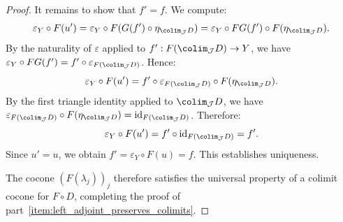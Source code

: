 \begin{proof}
    It remains to show that $f' = f$. We compute:
    $$
    \varepsilon_Y \circ F(u') = \varepsilon_Y \circ F(G(f') \circ \eta_{\colim_{\mathcal{J}} D}) = \varepsilon_Y \circ FG(f') \circ F(\eta_{\colim_{\mathcal{J}} D}).
    $$
    By the naturality of $\varepsilon$ applied to $f' : F(\colim_{\mathcal{J}} D) \to Y$, we have $\varepsilon_Y \circ FG(f') = f' \circ \varepsilon_{F(\colim_{\mathcal{J}} D)}$. Hence:
    $$
    \varepsilon_Y \circ F(u') = f' \circ \varepsilon_{F(\colim_{\mathcal{J}} D)} \circ F(\eta_{\colim_{\mathcal{J}} D}).
    $$
    By the first triangle identity applied to $\colim_{\mathcal{J}} D$, we have $\varepsilon_{F(\colim_{\mathcal{J}} D)} \circ F(\eta_{\colim_{\mathcal{J}} D}) = \mathrm{id}_{F(\colim_{\mathcal{J}} D)}$. Therefore:
    $$
    \varepsilon_Y \circ F(u') = f' \circ \mathrm{id}_{F(\colim_{\mathcal{J}} D)} = f'.
    $$
    Since $u' = u$, we obtain $f' = \varepsilon_Y \circ F(u) = f$. This establishes uniqueness.

    The cocone $(F(\lambda_j))_j$ therefore satisfies the universal property of a colimit cocone for $F \circ D$, completing the proof of part~\ref{item:left_adjoint_preserves_colimits}.
\end{proof}
